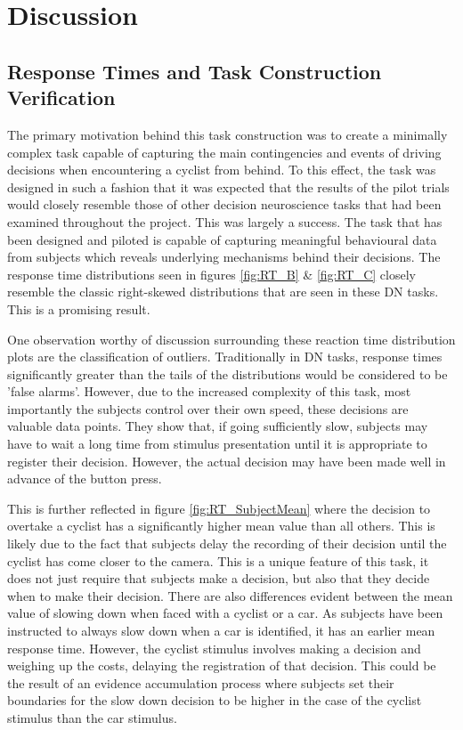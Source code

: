 \chapter{Discussion}
\section{Response Times and Task Construction Verification}
The primary motivation behind this task construction was to create a minimally complex task capable of capturing the main contingencies and events of driving decisions when encountering a cyclist from behind. To this effect, the task was designed in such a fashion that it was expected that the results of the pilot trials would closely resemble those of other decision neuroscience tasks that had been examined throughout the project.
This was largely a success. The task that has been designed and piloted is capable of capturing meaningful behavioural data from subjects which reveals underlying mechanisms behind their decisions. The response time distributions seen in figures \ref{fig:RT_B} \& \ref{fig:RT_C} closely resemble the classic right-skewed distributions that are seen in these DN tasks. This is a promising result.

One observation worthy of discussion surrounding these reaction time distribution plots are the classification of outliers. Traditionally in DN tasks, response times significantly greater than the tails of the distributions would be considered to be 'false alarms'. However, due to the increased complexity of this task, most importantly the subjects control over their own speed, these decisions are valuable data points. They show that, if going sufficiently slow, subjects may have to wait a long time from stimulus presentation until it is appropriate to register their decision. However, the actual decision may have been made well in advance of the button press.

This is further reflected in figure \ref{fig:RT_SubjectMean} where the decision to overtake a cyclist has a significantly higher mean value than all others. This is likely due to the fact that subjects delay the recording of their decision until the cyclist has come closer to the camera. This is a unique feature of this task, it does not just require that subjects make a decision, but also that they decide when to make their decision. There are also differences evident between the mean value of slowing down when faced with a cyclist or a car. As subjects have been instructed to always slow down when a car is identified, it has an earlier mean response time. However, the cyclist stimulus involves making a decision and weighing up the costs, delaying the registration of that decision. This could be the result of an evidence accumulation process where subjects set their boundaries for the slow down decision to be higher in the case of the cyclist stimulus than the car stimulus.

